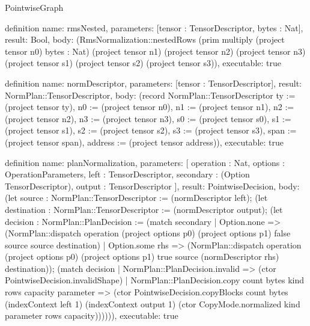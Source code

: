 \begin{lexlean}{PointwiseGraph}
\begin{semanticmodule}
definition{
  name: rmsNested,
  parameters: [tensor : TensorDescriptor, bytes : Nat],
  result: Bool,
  body: (RmsNormalization::nestedRows (prim multiply (project tensor n0) bytes : Nat) (project tensor n1) (project tensor n2) (project tensor n3) (project tensor s1) (project tensor s2) (project tensor s3)),
  executable: true
}

definition{
  name: normDescriptor,
  parameters: [tensor : TensorDescriptor],
  result: NormPlan::TensorDescriptor,
  body: (record NormPlan::TensorDescriptor {ty := (project tensor ty), n0 := (project tensor n0), n1 := (project tensor n1), n2 := (project tensor n2), n3 := (project tensor n3), s0 := (project tensor s0), s1 := (project tensor s1), s2 := (project tensor s2), s3 := (project tensor s3), span := (project tensor span), address := (project tensor address)}),
  executable: true
}

definition{
  name: planNormalization,
  parameters: [
    operation : Nat,
    options : OperationParameters,
    left : TensorDescriptor,
    secondary : (Option TensorDescriptor),
    output : TensorDescriptor
  ],
  result: PointwiseDecision,
  body: (let source : NormPlan::TensorDescriptor := (normDescriptor left); (let destination : NormPlan::TensorDescriptor := (normDescriptor output); (let decision : NormPlan::PlanDecision := (match secondary
    | Option.none => (NormPlan::dispatch operation (project options p0) (project options p1) false source source destination)
    | Option.some rhs => (NormPlan::dispatch operation (project options p0) (project options p1) true source (normDescriptor rhs) destination)); (match decision
    | NormPlan::PlanDecision.invalid => (ctor PointwiseDecision.invalidShape)
    | NormPlan::PlanDecision.copy count bytes kind rows capacity parameter => (ctor PointwiseDecision.copyBlocks count bytes (indexContext left 1) (indexContext output 1) (ctor CopyMode.normalized kind parameter rows capacity)))))),
  executable: true
}


\end{semanticmodule}
\end{lexlean}
